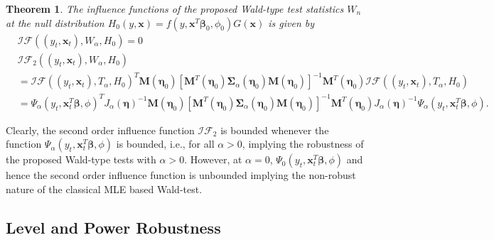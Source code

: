 \documentclass[a4paper]{article}%
\newtheorem{theorem}{Theorem}
\begin{document}
\begin{theorem}
\label{THM:second_IT_test} The influence functions of the proposed Wald-type
test statistics $W_{n}$ at the null distribution $H_{0}(y,\boldsymbol{x}%
)=f(y,\boldsymbol{x}^{T}\boldsymbol{\beta}_{0}, \phi_{0})G(\boldsymbol{x})$ is
given by
\begin{align}
&  \mathcal{IF}((y_{t},\boldsymbol{x}_{t}),W_{\alpha},H_{0}) = 0\nonumber\\
&  \mathcal{IF}_{2}((y_{t},\boldsymbol{x}_{t}),W_{\alpha},H_{0})\nonumber\\
&  = \mathcal{IF}((y_{t},\boldsymbol{x}_{t}),T_{\alpha},H_{0})^{T}%
\boldsymbol{M}\left(  \boldsymbol{\eta}_{0}\right)  \left[  \boldsymbol{M}%
^{T}\left(  \boldsymbol{\eta}_{0}\right)  \boldsymbol{\Sigma}_{\alpha}\left(
\boldsymbol{\eta}_{0}\right)  \boldsymbol{M}\left(  \boldsymbol{\eta}%
_{0}\right)  \right]  ^{-1} \boldsymbol{M}^{T}\left(  \boldsymbol{\eta}%
_{0}\right)  \mathcal{IF}((y_{t},\boldsymbol{x}_{t}),T_{\alpha},H_{0}%
)\nonumber\\
&  = \Psi_{\alpha}(y_{t},\boldsymbol{x}_{t}^{T}\boldsymbol{\beta},\phi)^{T}
J_{\alpha}(\boldsymbol{\eta})^{-1}\boldsymbol{M}\left(  \boldsymbol{\eta}%
_{0}\right)  \left[  \boldsymbol{M}^{T}\left(  \boldsymbol{\eta}_{0}\right)
\boldsymbol{\Sigma}_{\alpha}\left(  \boldsymbol{\eta}_{0}\right)
\boldsymbol{M}\left(  \boldsymbol{\eta}_{0}\right)  \right]  ^{-1}
\boldsymbol{M}^{T}\left(  \boldsymbol{\eta}_{0}\right)  J_{\alpha
}(\boldsymbol{\eta})^{-1} \Psi_{\alpha}(y_{t},\boldsymbol{x}_{t}%
^{T}\boldsymbol{\beta},\phi).\nonumber
\end{align}

\end{theorem}

Clearly, the second order influence function $\mathcal{IF}_2$ is bounded whenever the
function $\Psi_{\alpha}(y_{t},\boldsymbol{x}_{t}^{T}\boldsymbol{\beta},\phi)$
is bounded, i.e., for all $\alpha>0$, implying the robustness of the proposed
Wald-type tests with $\alpha>0$. However, at $\alpha=0$, $\Psi_{0}%
(y_{t},\boldsymbol{x}_{t}^{T}\boldsymbol{\beta},\phi)$ and hence the second
order influence function is unbounded implying the non-robust nature of the
classical MLE based Wald-test.

\subsection{Level and Power Robustness}
\end{document}
